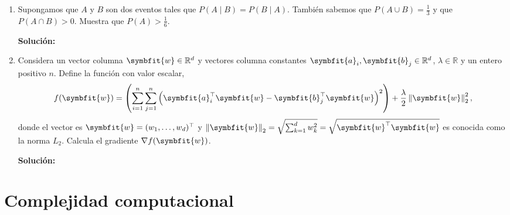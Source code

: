 \documentclass[11pt,letterpaper]{article}
\newenvironment{solution}{%
  \noindent\begin{shaded}
  \textbf{Solución:}\ }{
  \end{shaded}%
}
\newcommand{\bvec}[1]{\symbfit{#1}}
\newcommand{\norm}[1]{\left\lVert#1\right\rVert}
\begin{document}
\begin{enumerate}
  obteniendo \(\left(S, A, A, A, A\right)\).  Sabemos que la
  probabilidad de obtener esta secuencia es,
  \[ L(p) = (1-p)pppp = p^4(1-p) \]
  ¿Qué valor de \(p\) maximiza \(L(p)\)? Muestra que este valor de
  \(p\) maximiza \(L(p)\). ¿Cuál es una interpretación intuitiva de
  este valor de \(p\)?
  \begin{solution}
  \end{solution}
\item%
  Supongamos que \(A\) y \(B\) son dos eventos tales que \(P(A \mid B)
  = P(B \mid A)\).  También sabemos que \(P(A \cup B) = \frac{1}{3}\)
  y que \(P(A \cap B) > 0\).  Muestra que \(P(A) > \frac{1}{6}\).
  \begin{solution}
  \end{solution}
  
\item%
  Considera un vector columna \(\bvec{w}\in\mathbb{R}^d\) y vectores
  columna constantes \(\bvec{a}_i,\bvec{b}_j\in\mathbb{R}^d\),
  \(\lambda\in\mathbb{R}\) y un entero positivo \(n\).  Define la
  función con valor escalar,
  \[ f(\bvec{w})=\left(\sum_{i=1}^n\sum_{j=1}^n\left(\bvec{a}_i^\top\bvec{w}-\bvec{b}_j^\top\bvec{w}\right)^2\right)+\frac{\lambda}{2}\norm{\bvec{w}}_2^2, \]
  donde el vector es \(\bvec{w} = (w_1,\dots,w_d)^\top\) y
  \(\norm{\bvec{w}}_2 = \sqrt{\sum_{k=1}^d w_k^2} =
  \sqrt{\bvec{w}^\top\bvec{w}}\) es conocida como la norma \(L_2\).
  Calcula el gradiente \(\nabla f(\bvec{w})\).
  \begin{solution}
  \end{solution}
\end{enumerate}



\section*{Complejidad computacional}
\end{document}

